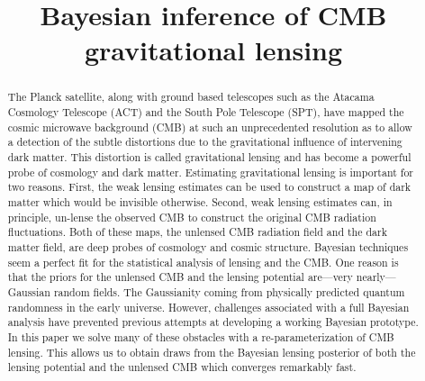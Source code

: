 \documentclass[noinfoline]{imsart}
\begin{document}
\begin{frontmatter}
\title{Bayesian inference of CMB gravitational lensing}

\begin{abstract} 
The Planck satellite, along with ground based telescopes such as the Atacama Cosmology Telescope (ACT)  and  the South Pole Telescope (SPT), have mapped the  cosmic microwave background (CMB) at such an unprecedented resolution as to allow a detection of the subtle distortions  due to the gravitational influence of intervening  dark matter. This distortion is called  gravitational lensing and has become a  powerful probe of cosmology and dark matter. Estimating gravitational lensing  is important for two reasons. First, the weak lensing estimates can be used to construct a map of dark matter which would be invisible otherwise. Second,  weak lensing estimates can, in principle, un-lense the observed CMB to construct the original CMB radiation fluctuations. Both of these maps,  the unlensed CMB radiation field and the dark matter field, are deep probes of cosmology and cosmic structure. Bayesian techniques seem a perfect fit for the statistical analysis of lensing and the CMB. One reason is that the priors for the unlensed CMB and the lensing potential are---very nearly---Gaussian random fields. The Gaussianity coming from physically predicted  quantum randomness in the early universe. However, challenges associated with a full Bayesian analysis have prevented previous attempts at  developing a working Bayesian prototype. 
In this paper we solve many of these obstacles with a re-parameterization of CMB lensing. This  allows us to obtain draws from the  Bayesian lensing posterior of both the lensing potential and the unlensed CMB which converges remarkably fast. 
\end{abstract}

\begin{keyword}
\end{keyword}

\end{frontmatter}
\end{document}
